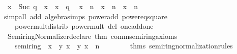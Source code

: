 \begin{isabellebody}
\ \ {\isachardoublequoteopen}x\ {\isacharcircum}{\kern0pt}\ {\isacharparenleft}{\kern0pt}Suc\ q{\isacharparenright}{\kern0pt}\ {\isacharequal}{\kern0pt}\ x\ {\isacharasterisk}{\kern0pt}\ {\isacharparenleft}{\kern0pt}x\ {\isacharcircum}{\kern0pt}\ q{\isacharparenright}{\kern0pt}{\isachardoublequoteclose}\isanewline
\ \ {\isachardoublequoteopen}x\ {\isacharcircum}{\kern0pt}\ {\isacharparenleft}{\kern0pt}{}{\isacharasterisk}{\kern0pt}n{\isacharparenright}{\kern0pt}\ {\isacharequal}{\kern0pt}\ {\isacharparenleft}{\kern0pt}x\ {\isacharcircum}{\kern0pt}\ n{\isacharparenright}{\kern0pt}\ {\isacharasterisk}{\kern0pt}\ {\isacharparenleft}{\kern0pt}x\ {\isacharcircum}{\kern0pt}\ n{\isacharparenright}{\kern0pt}{\isachardoublequoteclose}\isanewline
%
\isadelimproof
\ \ %
\endisadelimproof
%
\isatagproof
{}\isamarkupfalse%
\ {\isacharparenleft}{\kern0pt}simp{\isacharunderscore}{\kern0pt}all\ add{\isacharcolon}{\kern0pt}\ algebra{\isacharunderscore}{\kern0pt}simps\ power{\isacharunderscore}{\kern0pt}add\ power{}{\isacharunderscore}{\kern0pt}eq{\isacharunderscore}{\kern0pt}square\isanewline
\ \ \ \ power{\isacharunderscore}{\kern0pt}mult{\isacharunderscore}{\kern0pt}distrib\ power{\isacharunderscore}{\kern0pt}mult\ del{\isacharcolon}{\kern0pt}\ one{\isacharunderscore}{\kern0pt}add{\isacharunderscore}{\kern0pt}one{\isacharparenright}{\kern0pt}%
\endisatagproof
{\isafoldproof}%
%
\isadelimproof
\isanewline
%
\endisadelimproof
%
\isadelimML
\isanewline
%
\endisadelimML
%
\isatagML
{}\isamarkupfalse%
\ {\isacartoucheopen}\isanewline
\ \ Semiring{\isacharunderscore}{\kern0pt}Normalizer{\isachardot}{\kern0pt}declare\ {\isacharat}{\kern0pt}{\isacharbraceleft}{\kern0pt}thm\ comm{\isacharunderscore}{\kern0pt}semiring{\isacharunderscore}{\kern0pt}{}{\isacharunderscore}{\kern0pt}axioms{\isacharbraceright}{\kern0pt}\isanewline
\ \ \ \ {\isacharbraceleft}{\kern0pt}semiring\ {\isacharequal}{\kern0pt}\ {\isacharparenleft}{\kern0pt}{\isacharbrackleft}{\kern0pt}\isactrlterm {\isasymopen}x\ {\isacharplus}{\kern0pt}\ y{\isasymclose}{\isacharcomma}{\kern0pt}\ \isactrlterm {\isasymopen}x\ {\isacharasterisk}{\kern0pt}\ y{\isasymclose}{\isacharcomma}{\kern0pt}\ \isactrlterm {\isasymopen}x\ {\isacharcircum}{\kern0pt}\ n{\isasymclose}{\isacharcomma}{\kern0pt}\ \ \isanewline
\ \ \ \ \ \ {\isacharat}{\kern0pt}{\isacharbraceleft}{\kern0pt}thms\ semiring{\isacharunderscore}{\kern0pt}normalization{\isacharunderscore}{\kern0pt}rules{\isacharbraceright}{\kern0pt}{\isacharparenright}{\kern0pt}{\isacharcomma}{\kern0pt}\isanewline

\end{isabellebody}
